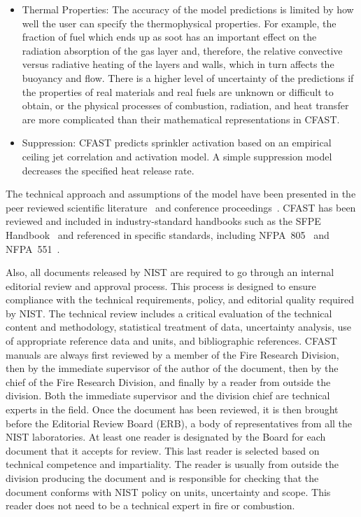 \begin{itemize}
\item Thermal Properties:  The accuracy of the model predictions is limited by how well the user can specify the thermophysical properties.  For example, the fraction of fuel which ends up as soot has an important effect on the radiation absorption of the gas layer and, therefore, the relative convective versus radiative heating of the layers and walls, which in turn affects the buoyancy and flow.  There is a higher level of uncertainty of the predictions if the properties of real materials and real fuels are unknown or difficult to obtain, or the physical processes of combustion, radiation, and heat transfer are more complicated than their mathematical representations in CFAST.
\item Suppression: CFAST predicts sprinkler activation based on an empirical ceiling jet correlation and activation model. A simple suppression model decreases the specified heat release rate.
\end{itemize}
The technical approach and assumptions of the model have been presented in the peer reviewed scientific literature~\cite{Jones:1993a, Jones:1985, Jones:1984} and conference proceedings~\cite{Jones:1991}. CFAST has been reviewed and included in industry-standard handbooks such as the SFPE Handbook~\cite{Walton:2003} and referenced in specific standards, including NFPA~805~\cite{NFPA805:2004} and NFPA~551~\cite{NFPA551:2004}.

Also, all documents released by NIST are required to go through an internal editorial review and approval process. This process is designed to ensure compliance with the technical requirements, policy, and editorial quality required by NIST. The technical review includes a critical evaluation of the technical content and methodology, statistical treatment of data, uncertainty analysis, use of appropriate reference data and units, and bibliographic references. CFAST manuals are always first reviewed by a member of the Fire Research Division, then by the immediate supervisor of the author of the document, then by the chief of the Fire Research Division, and finally by a reader from outside the division. Both the immediate supervisor and the division chief are technical experts in the field. Once the document has been reviewed, it is then brought before the Editorial Review Board (ERB), a body of representatives from all the NIST laboratories. At least one reader is designated by the Board for each document that it accepts for review. This last reader is selected based on technical competence and impartiality. The reader is usually from outside the division producing the document and is responsible for checking that the document conforms with NIST policy on units, uncertainty and scope. This reader does not need to be a technical expert in fire or combustion.

